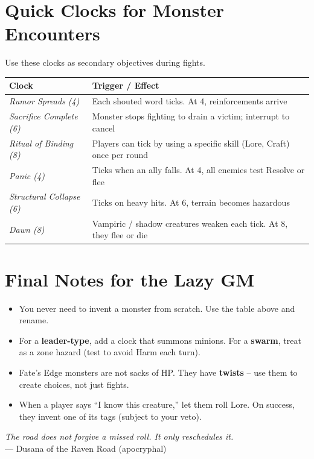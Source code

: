 \documentclass[10pt,twocolumn]{article}
\newcommand{\kw}[1]{\textbf{#1}}     %
\begin{document}
\section*{Quick Clocks for Monster Encounters}
Use these clocks as secondary objectives during fights.

\begin{tabular}{@{}ll}
\toprule
\kw{Clock} & \kw{Trigger / Effect} \\
\midrule
\textit{Rumor Spreads (4)} & Each shouted word ticks. At 4, reinforcements arrive \\
\textit{Sacrifice Complete (6)} & Monster stops fighting to drain a victim; interrupt to cancel \\
\textit{Ritual of Binding (8)} & Players can tick by using a specific skill (Lore, Craft) once per round \\
\textit{Panic (4)} & Ticks when an ally falls. At 4, all enemies test Resolve or flee \\
\textit{Structural Collapse (6)} & Ticks on heavy hits. At 6, terrain becomes hazardous \\
\textit{Dawn (8)} & Vampiric / shadow creatures weaken each tick. At 8, they flee or die \\
\bottomrule
\end{tabular}

\section*{Final Notes for the Lazy GM}
\begin{itemize}
    \item You never need to invent a monster from scratch. Use the table above and rename.
    \item For a \textbf{leader-type}, add a clock that summons minions. For a \textbf{swarm}, treat as a zone hazard (test to avoid Harm each turn).
    \item Fate's Edge monsters are not sacks of HP. They have \textbf{twists} -- use them to create choices, not just fights.
    \item When a player says ``I know this creature,'' let them roll Lore. On success, they invent one of its tags (subject to your veto).
\end{itemize}

\vspace{0.5in}
\begin{center}
\emph{The road does not forgive a missed roll. It only reschedules it.} \\
--- Dusana of the Raven Road (apocryphal)
\end{center}
\end{document}
